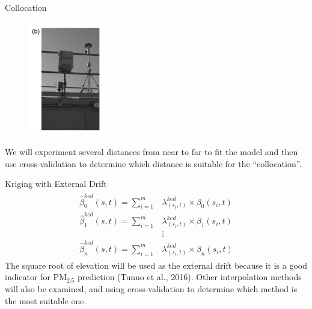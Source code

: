 \documentclass[handout]{beamer} %
\begin{document}
\begin{frame}{Collocation}
    \label{frm:col}
    \begin{figure}
        \centering
        \includegraphics[width=0.32\textwidth]{img/appendix/Aim2/collocation.png}
    \end{figure}
    We will experiment several distances from near to far to fit the model and then use cross-validation to determine which distance is suitable for the ``collocation''.
\end{frame}

\begin{frame}{Kriging with External Drift}
    \begin{align*}
        \begin{split}
        \hat{\beta}^{ked}_0(s,t)=\sum_{i=1}^m&\lambda^{ked}_{(s_i,t)}\times\beta_0(s_i,t) \\
        \hat{\beta}^{ked}_1(s,t)=\sum_{i=1}^m&\lambda^{ked}_{(s_i,t)}\times\beta_1(s_i,t) \\
        &\vdots \\
        \hat{\beta}^{ked}_n(s,t)=\sum_{i=1}^m&\lambda^{ked}_{(s_i,t)}\times\beta_n(s_i,t) 
        \end{split}
    \end{align*}
    \textcolor[rgb]{0.1,0.1,0.6}{\small The square root of elevation will be used as the external drift because it is a good indicator for PM$_{2.5}$ prediction (Tunno et al., 2016). Other interpolation methods will also be examined, and using cross-validation to determine which method is the most suitable one.}
\end{frame}
\end{document}
